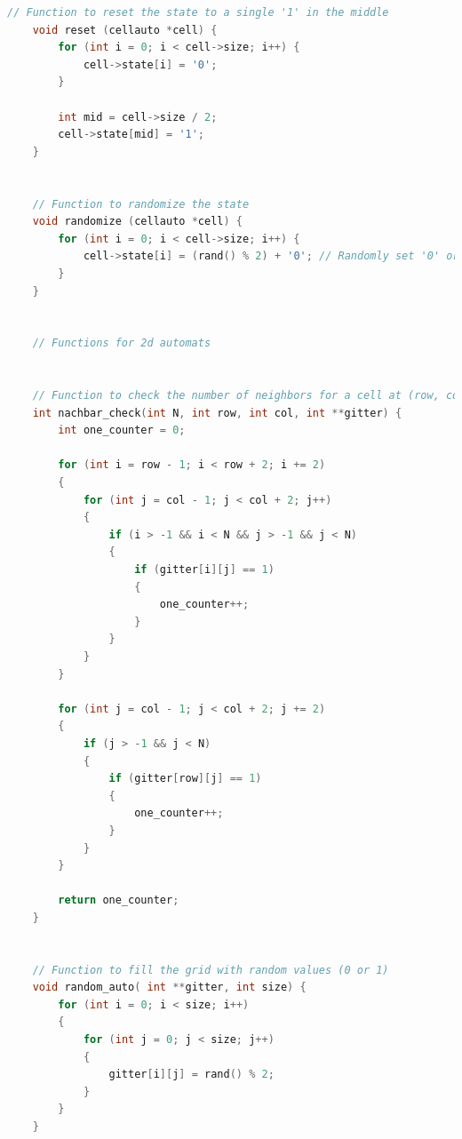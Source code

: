 \documentclass[12pt,a4paper]{article}
\begin{document}
\begin{lstlisting}[caption={\small cell.c},label={lst:p7001},basicstyle=\ttfamily\tiny,language=C]
    // Function to reset the state to a single '1' in the middle
    void reset (cellauto *cell) {
        for (int i = 0; i < cell->size; i++) {
            cell->state[i] = '0';
        }

        int mid = cell->size / 2;
        cell->state[mid] = '1';
    }


    // Function to randomize the state
    void randomize (cellauto *cell) {
        for (int i = 0; i < cell->size; i++) {
            cell->state[i] = (rand() % 2) + '0'; // Randomly set '0' or '1'
        }
    }


    // Functions for 2d automats


    // Function to check the number of neighbors for a cell at (row, col) in a grid of size N
    int nachbar_check(int N, int row, int col, int **gitter) {
        int one_counter = 0;

        for (int i = row - 1; i < row + 2; i += 2)
        {
            for (int j = col - 1; j < col + 2; j++)
            {
                if (i > -1 && i < N && j > -1 && j < N)
                {
                    if (gitter[i][j] == 1)
                    {
                        one_counter++;
                    }
                }
            }
        }

        for (int j = col - 1; j < col + 2; j += 2)
        {
            if (j > -1 && j < N)
            {
                if (gitter[row][j] == 1)
                {
                    one_counter++;
                }
            }
        }

        return one_counter;
    }


    // Function to fill the grid with random values (0 or 1)
    void random_auto( int **gitter, int size) {
        for (int i = 0; i < size; i++)
        {
            for (int j = 0; j < size; j++)
            {
                gitter[i][j] = rand() % 2;
            }
        }
    }
\end{lstlisting}


\vspace{1cm}

\end{document}
